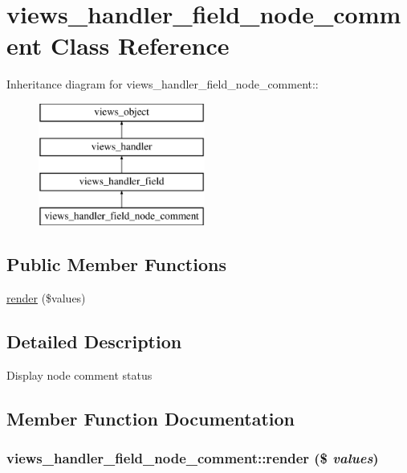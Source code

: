 \hypertarget{classviews__handler__field__node__comment}{
\section{views\_\-handler\_\-field\_\-node\_\-comment Class Reference}
\label{classviews__handler__field__node__comment}
}
Inheritance diagram for views\_\-handler\_\-field\_\-node\_\-comment::\begin{figure}[H]
\begin{center}
\leavevmode
\includegraphics[height=4cm]{classviews__handler__field__node__comment}
\end{center}
\end{figure}
\subsection*{Public Member Functions}
\begin{CompactItemize}
\item 
\hyperlink{classviews__handler__field__node__comment_51cfcaea207e77a961a1bf40aba96737}{render} (\$values)
\end{CompactItemize}


\subsection{Detailed Description}
Display node comment status 

\subsection{Member Function Documentation}
\hypertarget{classviews__handler__field__node__comment_51cfcaea207e77a961a1bf40aba96737}{
\subsubsection[{render}]{\setlength{\rightskip}{0pt plus 5cm}views\_\-handler\_\-field\_\-node\_\-comment::render (\$ {\em values})}}
\label{classviews__handler__field__node__comment_51cfcaea207e77a961a1bf40aba96737}


